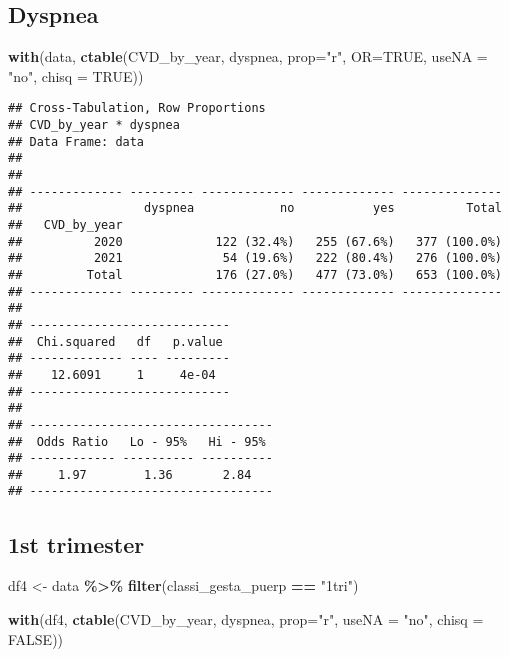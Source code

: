 \documentclass[
]{article}
\newenvironment{Shaded}{\begin{snugshade}}{\end{snugshade}}
\newcommand{\AttributeTok}[1]{\textcolor[rgb]{0.13,0.29,0.53}{#1}}
\newcommand{\ConstantTok}[1]{\textcolor[rgb]{0.56,0.35,0.01}{#1}}
\newcommand{\FunctionTok}[1]{\textcolor[rgb]{0.13,0.29,0.53}{\textbf{#1}}}
\newcommand{\NormalTok}[1]{#1}
\newcommand{\OtherTok}[1]{\textcolor[rgb]{0.56,0.35,0.01}{#1}}
\newcommand{\SpecialCharTok}[1]{\textcolor[rgb]{0.81,0.36,0.00}{\textbf{#1}}}
\newcommand{\StringTok}[1]{\textcolor[rgb]{0.31,0.60,0.02}{#1}}
\begin{document}
\hypertarget{dyspnea}{%
\subsection{Dyspnea}\label{dyspnea}}

\begin{Shaded}
\begin{Highlighting}[]
\FunctionTok{with}\NormalTok{(data, }\FunctionTok{ctable}\NormalTok{(CVD\_by\_year, dyspnea, }\AttributeTok{prop=}\StringTok{"r"}\NormalTok{, }\AttributeTok{OR=}\ConstantTok{TRUE}\NormalTok{, }\AttributeTok{useNA =} \StringTok{"no"}\NormalTok{, }\AttributeTok{chisq =} \ConstantTok{TRUE}\NormalTok{))}
\end{Highlighting}
\end{Shaded}

\begin{verbatim}
## Cross-Tabulation, Row Proportions  
## CVD_by_year * dyspnea  
## Data Frame: data  
## 
## 
## ------------- --------- ------------- ------------- --------------
##                 dyspnea            no           yes          Total
##   CVD_by_year                                                     
##          2020             122 (32.4%)   255 (67.6%)   377 (100.0%)
##          2021              54 (19.6%)   222 (80.4%)   276 (100.0%)
##         Total             176 (27.0%)   477 (73.0%)   653 (100.0%)
## ------------- --------- ------------- ------------- --------------
## 
## ----------------------------
##  Chi.squared   df   p.value 
## ------------- ---- ---------
##    12.6091     1     4e-04  
## ----------------------------
## 
## ----------------------------------
##  Odds Ratio   Lo - 95%   Hi - 95% 
## ------------ ---------- ----------
##     1.97        1.36       2.84   
## ----------------------------------
\end{verbatim}

\hypertarget{st-trimester}{%
\subsection{1st trimester}\label{st-trimester}}

\begin{Shaded}
\begin{Highlighting}[]
\NormalTok{df4 }\OtherTok{\textless{}{-}}\NormalTok{ data }\SpecialCharTok{\%\textgreater{}\%} 
  \FunctionTok{filter}\NormalTok{(classi\_gesta\_puerp }\SpecialCharTok{==} \StringTok{"1tri"}\NormalTok{)}

\FunctionTok{with}\NormalTok{(df4, }\FunctionTok{ctable}\NormalTok{(CVD\_by\_year, dyspnea, }\AttributeTok{prop=}\StringTok{"r"}\NormalTok{, }\AttributeTok{useNA =} \StringTok{"no"}\NormalTok{, }\AttributeTok{chisq =} \ConstantTok{FALSE}\NormalTok{))}
\end{Highlighting}
\end{Shaded}
\end{document}

